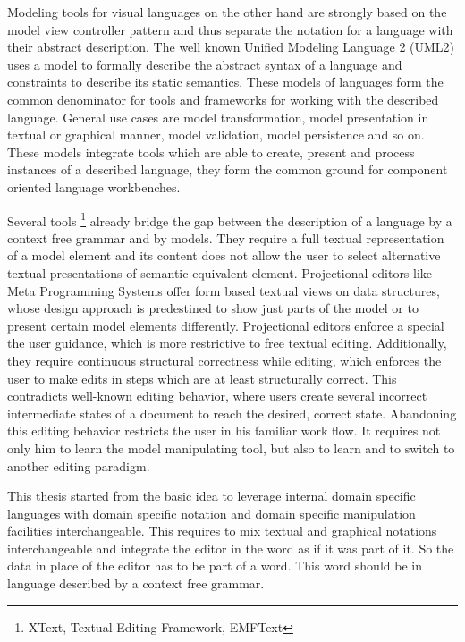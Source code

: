 Modeling tools for visual languages on the other hand are strongly based on the model view controller pattern and thus separate the notation for a language with their abstract description. The well known Unified Modeling Language 2 (UML2) uses a model to formally describe the abstract syntax of a language and constraints to describe its static semantics. These models of languages form the common denominator for tools and frameworks for working with the described language. General use cases are model transformation, model presentation in textual or graphical manner, model validation, model persistence and so on. These models integrate tools which are able to create, present and process instances of a described language, they form the common ground for component oriented language workbenches. 

Several tools \footnote{\raggedright XText, Textual Editing Framework, EMFText} already bridge the gap between the description of a language by a context free grammar and by models. They require a full textual representation of a model element and its content does not allow the user to select alternative textual presentations of semantic equivalent element. Projectional editors like Meta Programming Systems offer form based textual views on data structures, whose design approach is 	 predestined to show just parts of the model or to present certain model elements differently. Projectional editors enforce a special the user guidance, which is more restrictive to free textual editing. Additionally, they require continuous structural correctness while editing, which enforces the user to make edits in steps which are at least structurally correct. This contradicts well-known editing behavior, where users create several incorrect intermediate states of a document to reach the desired, correct state. Abandoning this editing behavior restricts the user in his familiar work flow. It requires not only him to learn the model manipulating tool, but also to learn and to switch to another editing paradigm. 

This thesis started from the basic idea to leverage internal domain specific languages with domain specific notation and domain specific manipulation facilities interchangeable. This requires to mix textual and graphical notations interchangeable and integrate the editor in the word as if it was part of it. So the data in place of the editor has to be part of a word. This word should be in language described by a context free grammar.
 
